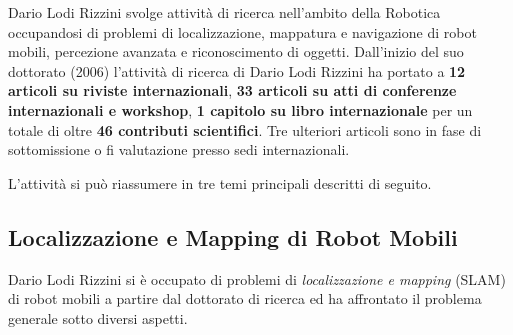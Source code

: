 \documentclass[11pt]{article}
\begin{document}
Dario Lodi Rizzini svolge attivit\`a di ricerca nell'ambito della Robotica occupandosi di problemi di localizzazione, mappatura e navigazione di robot mobili, percezione avanzata e riconoscimento di oggetti.
Dall'inizio del suo dottorato (2006) l'attivit\`a di ricerca di Dario Lodi Rizzini ha portato a 
\textbf{12 articoli su riviste internazionali}, 
\textbf{33 articoli su atti di conferenze internazionali e workshop},
\textbf{1 capitolo su libro internazionale} 
per un totale di oltre \textbf{46 contributi scientifici}.
Tre ulteriori articoli sono in fase di sottomissione o fi valutazione presso sedi internazionali.
 
L'attivit\`a si pu\`o riassumere in tre temi principali descritti di seguito.  

\subsection*{Localizzazione e Mapping di Robot Mobili}

Dario Lodi Rizzini si \`e occupato di problemi di  \emph{localizzazione e mapping} (SLAM) di robot mobili a partire dal dottorato di ricerca ed ha affrontato il problema generale sotto diversi aspetti.
\end{document}
